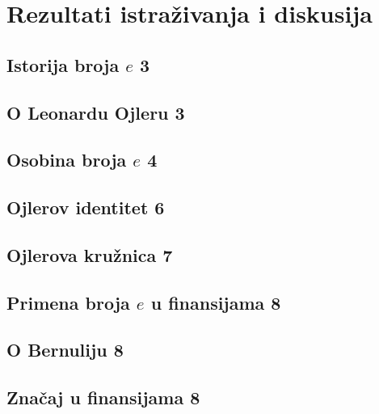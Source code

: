 \documentclass{article}
\begin{document}
\paragraph{}




\newpage{}

\title{\Large{}}

\section{\LARGE Rezultati istraživanja i diskusija}
    \subsection{\Large\normalfont Istorija broja $e$ \hspace{8.1cm} 3}
    \subsection{\Large\normalfont O Leonardu Ojleru \hspace{7.2cm} 3}
    \subsection{\Large\normalfont Osobina broja $e$ \hspace{7.88cm} 4}
    \subsection{\Large\normalfont Ojlerov identitet \hspace{7.7cm} 6}
    \subsection{\Large\normalfont Ojlerova kružnica \hspace{7.5cm} 7}
    \subsection{\Large\normalfont Primena broja $e$ u finansijama \hspace{4.85cm} 8}
    \subsection{\Large\normalfont O Bernuliju \hspace{8.7cm} 8}
    \subsection{\Large\normalfont Značaj u finansijama \hspace{6.75cm} 8}
\end{document}
